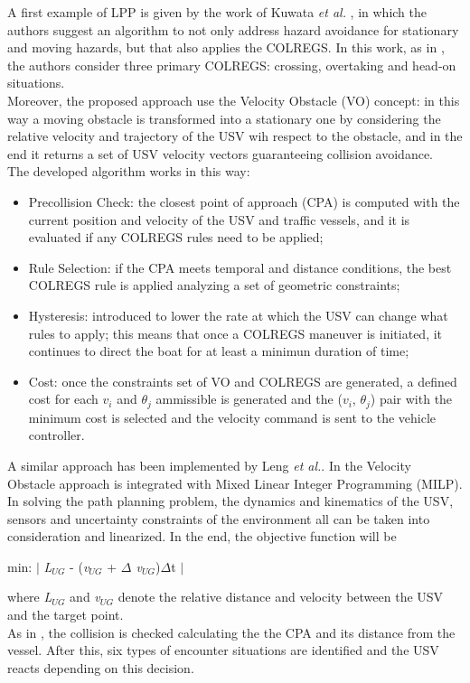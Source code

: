 \documentclass[12pt]{article}
\begin{document}
              A first example of LPP is given by the work of Kuwata \textit{et al.} \parencite{Kuwata2014}, in which the authors suggest an algorithm to not only address hazard avoidance for stationary and moving hazards, but that also applies the COLREGS. In this work, as in \parencite{Larson2007}, the authors consider three primary COLREGS: crossing, overtaking and head-on situations.\\
              Moreover, the proposed approach use the Velocity Obstacle (VO) concept: in this way a moving obstacle is transformed  into a stationary one by considering the relative velocity and trajectory of the USV wih respect to the obstacle, and in the end it returns a set of USV velocity vectors guaranteeing collision avoidance.\\
              The developed algorithm works in this way:
                    \begin{itemize}
                          \item Precollision Check: the closest point of approach (CPA) is computed with the current position and velocity of the USV and traffic vessels, and it is evaluated if any COLREGS rules need to be applied;
                          \item Rule Selection: if the CPA meets temporal and distance conditions, the best COLREGS rule is applied analyzing a set of geometric constraints;
                          \item Hysteresis: introduced to lower the rate at which the USV can change what rules to apply; this means that once a COLREGS maneuver is initiated, it continues to direct the boat for at least a minimun duration of time;
                          \item Cost: once the constraints set of VO and COLREGS are generated, a defined cost for each \textit{$v_i$} and \textit{$\theta_j$} ammissible is generated and the (\textit{$v_i$}, \textit{$\theta_j$}) pair with the minimum cost is selected and the velocity command is sent to the vehicle controller.
                    \end{itemize}

              \indent A similar approach has been implemented by Leng \textit{et al.}. In \parencite{Leng2013} the Velocity Obstacle approach is integrated with Mixed Linear Integer Programming (MILP). In solving the path planning problem, the dynamics and kinematics of the USV, sensors and uncertainty constraints of the environment all can be taken into consideration and linearized. In the end, the objective function will be
                  \begin{center}
                    min: $ \mid $ \textit{L$_{UG}$} - (\textit{v$_{UG}$} + \textit{$\Delta$ v$_{UG}$})$\Delta$t $ \mid$
                  \end{center}
              where \textit{L$_{UG}$} and \textit{v$_{UG}$} denote the relative distance and velocity between the USV and the target point.\\
              As in \parencite{Kuwata2014}, the collision is checked calculating the the CPA and its distance from the vessel. After this, six types of encounter situations are identified and the USV reacts depending on this decision.
\end{document}
